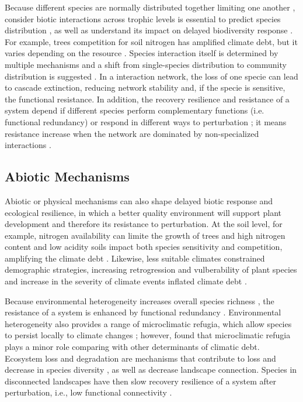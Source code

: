 Because different species are normally distributed together limiting one another \parencite{Clark2014a}, consider biotic interactions across trophic levels is essential to predict species distribution \parencite{VanderPutten2010}, as well as understand its impact on delayed biodiversity response \parencite{Essl2015}.
For example, trees competition for soil nitrogen has amplified climate debt, but it varies depending on the resource \parencite{Bertrand2016}.
Species interaction itself is determined by multiple mechanisms \parencite[for an overview]{Louthan2015} and a shift from single-species distribution to community distribution is suggested \parencite{Cazelles2016}.
In a interaction network, the loss of one specie can lead to cascade extinction, reducing network stability \parencite{Dunne2002} and, if the specie is sensitive, the functional resistance.
In addition, the recovery resilience and resistance of a system depend if different species perform complementary functions (i.e. functional redundancy) or respond in different ways to perturbation \parencite{Winfree2009}; it means resistance increase when the network are dominated by non-specialized interactions \parencite{Oliver2015}.

\subsection{Abiotic Mechanisms}

Abiotic or physical mechanisms can also shape delayed biotic response and ecological resilience, in which a better quality environment will support plant development and therefore its resistance to perturbation.
At the soil level, for example, nitrogen availability can limite the growth of trees \parencite{Sullivan2013} and high nitrogen content and low acidity soils impact both species sensitivity and competition, amplifying the climate debt \parencite{Bertrand2016}.
Likewise, less suitable climates constrained demographic strategies, increasing retrogression and vulberability of plant species \parencite{Csergo2017}  and increase in the severity of climate events inflated climate debt \parencite{Bertrand2016}.

Because environmental heterogeneity increases overall species richness \parencite{Stein2014}, the resistance of a system is enhanced by functional redundancy \parencite{Oliver2015}.
Environmental heterogeneity also provides a range of microclimatic refugia, which allow species to persist locally to climate changes \parencite{Maclean2015}; however, \textcite{Bertrand2016} found that microclimatic refugia plays a minor role comparing with other determinants of climatic debt.
Ecosystem loss and degradation are mechanisms that contribute to loss and decrease in species diversity \parencite{Essl2015}, as well as decrease landscape connection.
Species in disconnected landscapes have then slow recovery resilience of a system after perturbation, i.e., low functional connectivity \parencite{Oliver2015}.

